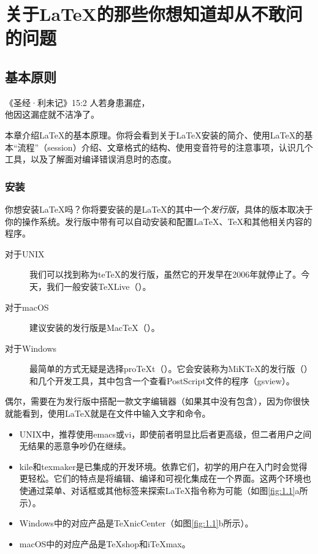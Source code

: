 \part{关于\LaTeX 的那些你想知道却从不敢问的问题}

\chapter{基本原则}
\begin{epigraphe}{《圣经·利未记》15:2}
    人若身患漏症，\\他因这漏症就不洁净了。
\end{epigraphe}

本章介绍\LaTeX 的基本原理。你将会看到关于\LaTeX 安装的简介、使用\LaTeX 的基本“流程”（session）介绍、文章格式的结构、使用变音符号的注意事项，认识几个工具，以及了解面对编译错误消息时的态度。

\section{安装}

你想安装\LaTeX 吗？你将要安装的是\LaTeX 的其中一个\textit{发行版}，具体的版本取决于你的操作系统。发行版中带有可以自动安装和配置\LaTeX 、\TeX 和其他相关内容的程序。

\begin{description}
\item[对于UNIX]我们可以找到称为te\TeX 的发行版，虽然它的开发早在2006年就停止了。今天，我们一般安装\TeX Live（）。

\item[对于macOS]建议安装的发行版是Mac\TeX（）。

\item[对于Windows]最简单的方式无疑是选择pro\TeX t（）。它会安装称为MiK\TeX 的发行版（）和几个开发工具，其中包含一个查看PostScript文件的程序（\textsf{gsview}）。

\end{description}

偶尔，需要在为发行版中搭配一款文字编辑器（如果其中没有包含），因为你很快就能看到，使用\LaTeX 就是在文件中输入文字和命令。

\begin{itemize}
    \item UNIX中，推荐使用\textsf{emacs}或\textsf{vi}，即使前者明显比后者更高级，但二者用户之间无结果的恶意争吵仍在继续。
    \item \textsf{kile}和\textsf{texmaker}是已集成的开发环境。依靠它们，初学的用户在入门时会觉得更轻松。它们的特点是将编辑、编译和可视化集成在一个界面。这两个环境也使通过菜单、对话框或其他标签来探索\LaTeX 指令称为可能（如图\ref{fig:1.1}a所示）。
    \item Windows中的对应产品是\textsf{\TeX nicCenter}（如图\ref{fig:1.1}b所示）。
    \item macOS中的对应产品是\textsf{\TeX shop}和\textsf{i\TeX max}。
\end{itemize}


